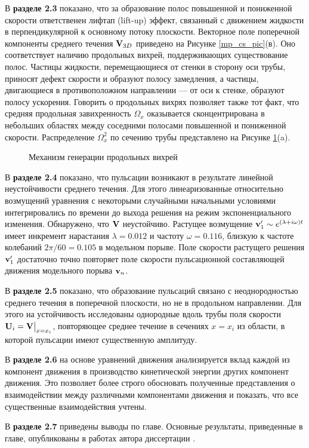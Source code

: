 В \textbf{разделе 2.3} показано, что за образование полос повышенной и пониженной скорости ответственен лифтап (lift-up) эффект, связанный с движением жидкости в перпендикулярной к основному потоку плоскости. Векторное поле поперечной компоненты среднего течения $\mathbf{V}_{3D}$ приведено на Рисунке \ref{mp_cs_pic}(в). Оно соответствует наличию продольных вихрей, поддерживающих существование полос. Частицы жидкости, перемещающиеся от стенки в сторону оси трубы, приносят дефект скорости и образуют полосу замедления, а частицы, двигающиеся в противоположном направлении --- от оси к стенке, образуют полосу ускорения. Говорить о продольных вихрях позволяет также тот факт, что средняя продольная завихренность $\Omega_x$ оказывается сконцентрирована в небольших областях между соседними полосами повышенной и пониженной скорости. Распределение $\Omega^2_x$ по сечению трубы представлено на Рисунке \ref{OXgen_pic}(a).

\begin{figure}
\caption{Механизм генерации продольных вихрей}
\label{OXgen_pic}
\end{figure}

В \textbf{разделе 2.4} показано, что пульсации возникают в результате линейной неустойчивости среднего течения. Для этого линеаризованные относительно возмущений уравнения с некоторыми случайными начальными условиями интегрировались по времени до выхода решения на режим экспоненциального изменения. Обнаружено, что $\mathbf{V}$ неустойчиво. Растущее возмущение $\mathbf{v}'_1 \sim e^{(\lambda+i\omega)t}$ имеет инкремент нарастания $\lambda=0.012$ и частоту $\omega=0.116$, близкую к частоте колебаний $2\pi/60=0.105$ в модельном порыве. Поле скорости растущего решения $\mathbf{v}'_1$ достаточно точно повторяет поле скорости пульсационной составляющей движения модельного порыва $\mathbf{v}_n$. 

В \textbf{разделе 2.5} показано, что образование пульсаций связано с неоднородностью среднего течения в поперечной плоскости, но не в продольном направлении. Для этого на устойчивость исследованы однородные вдоль трубы поля скорости $\mathbf{U}_i = \mathbf{V}\big|_{x=x_i}$, повторяющее среднее течение в сечениях $x = x_i$ из области, в которой пульсации имеют существенную амплитуду. 

В \textbf{разделе 2.6} на основе уравнений движения анализируется вклад каждой из компонент движения в производство кинетической энергии других компонент движения. Это позволяет более строго обосновать полученные представления о взаимодействии между различными компонентами движения и показать, что все существенные взаимодействия учтены.

В \textbf{разделе 2.7} приведены выводы по главе. Основные результаты, приведенные в главе, опубликованы в работах автора диссертации \cite{MZG2015, Kazan2015, KMU2014, KMU2015}.


